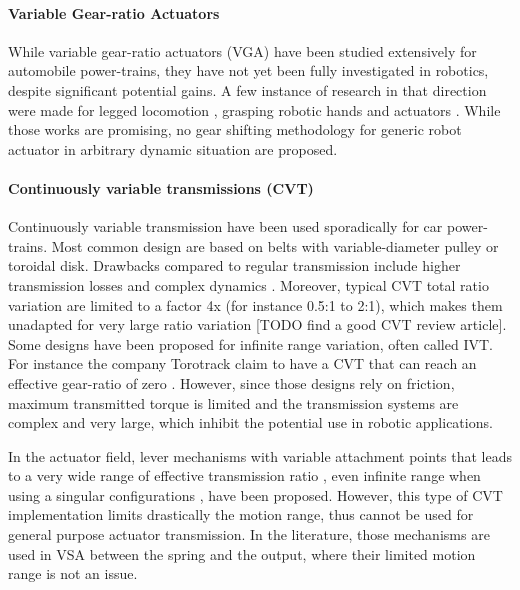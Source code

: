 
\paragraph{Variable Gear-ratio Actuators} 
While variable gear-ratio actuators (VGA) have been studied extensively for automobile power-trains, they have not yet been fully investigated in robotics, despite significant potential gains. A few instance of research in that direction were made for legged locomotion \cite{hirose_design_1991}, grasping robotic hands \cite{shin_robot_2012} and actuators \cite{hirose_development_1999} \cite{byeong-sang_kim_improved_2007}\cite{tahara_high-backdrivable_2011}. While those works are promising, no gear shifting methodology for generic robot actuator in arbitrary dynamic situation are proposed.


\paragraph{Continuously variable transmissions (CVT)} 

Continuously variable transmission have been used sporadically for car power-trains. Most common design are based on belts with variable-diameter pulley or toroidal disk. Drawbacks compared to regular transmission include higher transmission losses and complex dynamics \cite{srivastava_review_2009}. Moreover, typical CVT total ratio variation are limited to a factor 4x (for instance 0.5:1 to 2:1), which makes them unadapted for very large ratio variation [TODO find a good CVT review article]. Some designs have been proposed for infinite range variation, often called IVT. For instance the company Torotrack claim to have a CVT that can reach an effective gear-ratio of zero \cite{schoolcraft_gear_2011}. However, since those designs rely on friction, maximum transmitted torque is limited and the transmission systems are complex and very large, which inhibit the potential use in robotic applications.

In the actuator field, lever mechanisms with variable attachment points that leads to a very wide range of effective transmission ratio \cite{tahara_high-backdrivable_2011}, even infinite range when using a singular configurations \cite{jafari_new_2014}, have been proposed. However, this type of CVT implementation limits drastically the motion range, thus cannot be used for general purpose actuator transmission. In the literature, those mechanisms are used in VSA between the spring and the output, where their limited motion range is not an issue. 

